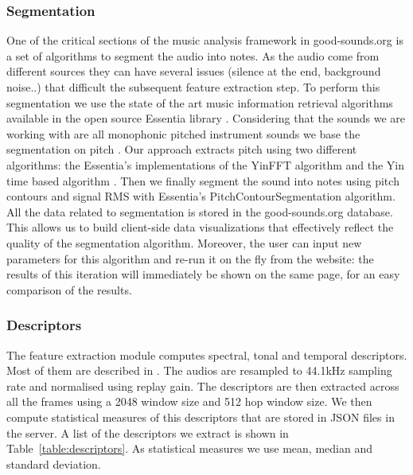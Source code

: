 \documentclass{article}
\begin{document}
\subsubsection{Segmentation}
One of the critical sections of the music analysis framework in good-sounds.org is a set of algorithms to segment the audio into notes. As the audio come from different sources they can have several issues (silence at the end, background noise..) that difficult the subsequent feature extraction step. 
To perform this segmentation we use the state of the art music information retrieval algorithms available in the open source Essentia library \cite{03}. Considering that the sounds we are working with are all monophonic pitched instrument sounds we base the segmentation on pitch . Our approach extracts pitch using two different algorithms: the Essentia’s implementations of the YinFFT algorithm \cite{04} and the Yin time based algorithm \cite{05}. Then we finally segment the sound into notes using pitch contours \cite{06} and signal RMS with Essentia’s PitchContourSegmentation algorithm.  
All the data related to segmentation is stored in the good-sounds.org database. This allows us to build client-side data visualizations that effectively reflect the quality of the segmentation algorithm. Moreover, the user can input new parameters for this algorithm and re-run it on the fly from the website: the results of this iteration will immediately be shown on the same page, for an easy comparison of the results.

\subsubsection{Descriptors}
The feature extraction module computes spectral, tonal and temporal descriptors. Most of them are described in \cite{07}. The audios are resampled to 44.1kHz sampling rate and normalised using replay gain. The descriptors are then extracted across all the frames using a 2048 window size and 512 hop window size. We then compute statistical measures of this descriptors that are stored in JSON files in the server. A list of the descriptors we extract is shown in Table~\ref{table:descriptors}. As statistical measures we use mean, median and standard deviation. 
\end{document}
